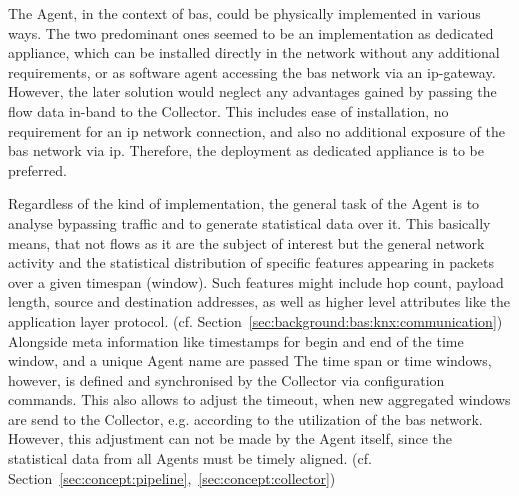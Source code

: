 The Agent, in the context of \gls{bas}, could be physically implemented in various ways.
The two predominant ones seemed to be an implementation as dedicated appliance, which can be installed directly in the network without any additional requirements, or as software agent accessing the \gls{bas} network via an \gls{ip}-gateway.
However, the later solution would neglect any advantages gained by passing the flow data in-band to the Collector. This includes ease of installation, no requirement for an \gls{ip} network connection, and also no additional exposure of the \gls{bas} network via \gls{ip}.
Therefore, the deployment as dedicated appliance is to be preferred.

Regardless of the kind of implementation, the general task of the Agent is to analyse bypassing traffic and to generate statistical data over it.
This basically means, that not flows as it are the subject of interest but the general network activity and the statistical distribution of specific features appearing in packets over a given timespan (window).
Such features might include hop count, payload length, source and destination addresses, as well as higher level attributes like the application layer protocol. (cf. Section~\ref{sec:background:bas:knx:communication}) Alongside meta information like timestamps for begin and end of the time window, and a unique Agent name are passed
The time span or time windows, however, is defined and synchronised by the Collector via configuration commands. This also allows to adjust the timeout, when new aggregated windows are send to the Collector, e.g. according to the utilization of the \gls{bas} network.
However, this adjustment can not be made by the Agent itself, since the statistical data from all Agents must be timely aligned. (cf. Section~\ref{sec:concept:pipeline},~\ref{sec:concept:collector})

